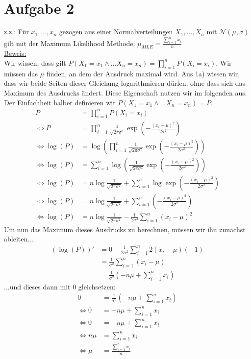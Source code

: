 \documentclass[a4paper]{scrartcl}
\begin{document}
\section*{Aufgabe 2}
z.z.: Für $x_1,...,x_n$ gezogen aus einer Normalverteilungen $X_1,...,X_n$ mit $\mathcal{N}(\mu, \sigma)$ gilt mit der Maximum Likelihood Methode: $\mu_{MLE} = \frac{\sum_{i=1}^{n} x_i}{n}$\\
\underline{Beweis:}\\
Wir wissen, dass gilt $P(X_1 = x_1 \wedge ... X_n = x_n) = \prod_{i=1}^n P(X_i = x_i)$. Wir müssen das $\mu$ finden, an dem der Ausdruck maximal wird. Aus 1a) wissen wir, dass wir beide Seiten dieser Gleichung logarithmieren dürfen, ohne dass sich das Maximum des Ausdrucks ändert. Diese Eigenschaft nutzen wir im folgenden aus. Der Einfachheit halber definieren wir $P(X_1 = x_1 \wedge ... X_n = x_n) = P$.
\begin{align*}
	P &= \prod_{i=1}^n P(X_i = x_i)\\
	\Leftrightarrow P &= \prod_{i=1}^n \frac{1}{\sqrt{2\pi \sigma^2}} \exp{(- \frac{(x_i-\mu)^2}{2\sigma^2})}\\
	\Leftrightarrow \log(P) &= \log(\prod_{i=1}^n \frac{1}{\sqrt{2\pi \sigma^2}} \exp{(- \frac{(x_i-\mu)^2}{2\sigma^2})})\\
	\Leftrightarrow \log(P) &= \sum_{i=1}^{n}\log( \frac{1}{\sqrt{2\pi \sigma^2}} \exp{(- \frac{(x_i-\mu)^2}{2\sigma^2})})\\
	\Leftrightarrow \log(P) &= n \log\frac{1}{\sqrt{2\pi \sigma^2}} + \sum_{i=1}^{n} \log\exp{(- \frac{(x_i-\mu)^2}{2\sigma^2})}\\
	\Leftrightarrow \log(P) &= n \log\frac{1}{\sqrt{2\pi \sigma^2}} + \sum_{i=1}^{n} (- \frac{(x_i-\mu)^2}{2\sigma^2})\\
	\Leftrightarrow \log(P) &= n \log\frac{1}{\sqrt{2\pi \sigma^2}} - \frac{1}{2\sigma^2}\sum_{i=1}^{n} (x_i-\mu)^2
\end{align*}
Um nun das Maximum dieses Ausdrucks zu berechnen, müssen wir ihn zunächst ableiten...
\begin{align*}
	(\log(P))' &= 0 - \frac{1}{2\sigma^2}\sum_{i=1}^{n} 2(x_i-\mu)(-1)\\
	&= \frac{1}{\sigma^2}\sum_{i=1}^{n} (x_i-\mu)\\
	&= \frac{1}{\sigma^2}(- n\mu + \sum_{i=1}^{n} x_i)
\end{align*}
...und dieses dann mit 0 gleichsetzen:
\begin{align*}
	0 &= \frac{1}{\sigma^2}(- n\mu + \sum_{i=1}^{n} x_i)\\
	\Leftrightarrow 0 &=- n\mu + \sum_{i=1}^{n} x_i\\
	\Leftrightarrow 0 &= - n\mu + \sum_{i=1}^{n} x_i\\
	\Leftrightarrow n\mu &= \sum_{i=1}^{n} x_i\\
	\Leftrightarrow \mu &= \frac{\sum_{i=1}^{n} x_i}{n}
\end{align*}
\end{document}
